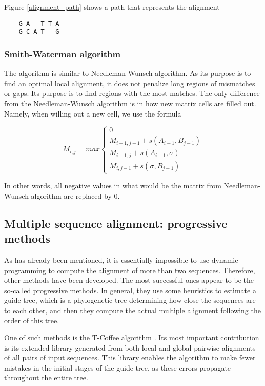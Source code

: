 Figure \ref{alignment_path} shows a path that represents the alignment

\begin{verbatim}
    G A - T T A
    G C A T - G
\end{verbatim}

\subsubsection{Smith-Waterman algorithm}

The algorithm is similar to Needleman-Wunsch algorithm. As its purpose is to find an optimal local alignment, it does not
penalize long regions of mismatches or gaps. Its purpose is to find regions with the most matches. The only difference from the Needle\-man-Wunsch 
algorithm is in how new matrix cells are filled out. Namely, when willing out a new cell, we use the formula

\[ M_{i, j} = max
    \begin{cases}
        0   \\
        M_{i-1, j-1} + s(A_{i-1}, B_{j-1}) \\
        M_{i-1, j} + s(A_{i-1}, \sigma)    \\
        M_{i, j-1} + s(\sigma, B_{j-1})
    \end{cases}
\]

In other words, all negative values in what would be the matrix from Needle\-man-Wunsch algorithm are replaced by 0.

\subsection{Multiple sequence alignment: progressive methods}

As has already been mentioned, it is essentially impossible to use dynamic programming to compute the alignment of more than two sequences.
Therefore, other methods have been developed. The most successful ones appear to be the so-called progressive methods. In general,
they use some heuristics to estimate a guide tree, which is a phylogenetic tree determining how close the sequences are to each other,
and then they compute the actual multiple alignment following the order of this tree.

One of such methods is the T-Coffee algorithm \citep{t_coffee}. Its most important contribution is its extended library generated from
both local and global pairwise alignments of all pairs of input sequences. This library enables the algorithm to make fewer mistakes
in the initial stages of the guide tree, as these errors propagate throughout the entire tree.

